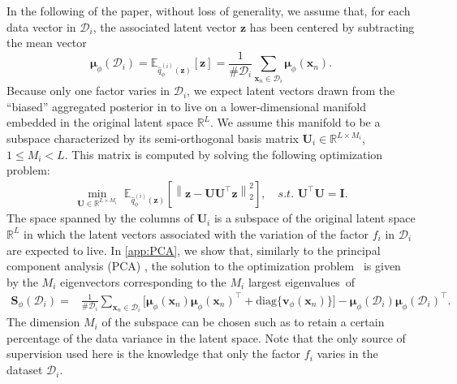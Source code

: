 \documentclass[review]{elsarticle}
\newcommand{\diag}{\text{diag}}
\begin{document}
In the following of the paper, without loss of generality, we assume that, for each data vector in $\mathcal{D}_i$, the associated latent vector $\mathbf{z}$ has been centered by subtracting the mean vector
\begin{equation}
    \boldsymbol{\mu}_\phi(\mathcal{D}_i) = \mathbb{E}_{\hat{q}_\phi^{(i)}(\mathbf{z})}[\mathbf{z}] = \frac{1}{\# \mathcal{D}_i}\sum_{\mathbf{x}_n \in \mathcal{D}_i} \boldsymbol{\mu}_{\phi}(\mathbf{x}_n).
    \label{mu_Di}
\end{equation}
Because only one factor varies in $\mathcal{D}_i$, we expect latent vectors drawn from the ``biased'' aggregated posterior in  to live on a lower-dimensional manifold embedded in the original latent space $\mathbb{R}^L$. We assume this manifold to be a subspace characterized by its semi-orthogonal basis matrix $\mathbf{U}_i \in \mathbb{R}^{L \times M_i}$, $1 \le M_i < L$. This matrix is computed by solving the following optimization problem:
\begin{align}
\min_{\mathbf{U} \in \mathbb{R}^{L \times M_i}}\,\,  \mathbb{E}_{\hat{q}_\phi^{(i)}(\mathbf{z})} \left[ \left\lVert \mathbf{z} - \mathbf{U} \mathbf{U}^\top \mathbf{z} \right\rVert_2^2 \right], \quad s.t.\,\, \mathbf{U}^\top \mathbf{U} = \mathbf{I}.
\label{pca_opt_prb_1}
\end{align}
The space spanned by the columns of $\mathbf{U}_i$ is a subspace of the original latent space $\mathbb{R}^L$ in which the latent vectors associated with the variation of the factor $f_i$ in $\mathcal{D}_i$ are expected to live.
In \ref{app:PCA}, we show that, similarly to the  principal component analysis (PCA) \citep{pearson1901liii}, the solution to the optimization problem~ is given by the $M_i$ eigenvectors corresponding to the $M_i$ largest eigenvalues~of
\begin{align}
     \mathbf{S}_\phi(\mathcal{D}_i) =& \frac{1}{\# \mathcal{D}_i} \sum_{\mathbf{x}_n \in \mathcal{D}_i} \Big[ \boldsymbol{\mu}_{\phi}(\mathbf{x}_n)\boldsymbol{\mu}_{\phi}(\mathbf{x}_n)^\top + \diag\{\mathbf{v}_{\phi}(\mathbf{x}_n)\} \Big]  - \boldsymbol{\mu}_\phi(\mathcal{D}_i)\boldsymbol{\mu}_\phi(\mathcal{D}_i)^\top.
    \label{S_Di}   
\end{align}
The dimension $M_i$ of the subspace can be chosen such as to retain a certain percentage of the data variance in the latent space. Note that the only source of supervision used here is the knowledge that only the factor $f_i$ varies in the dataset $\mathcal{D}_i$.
\end{document}
